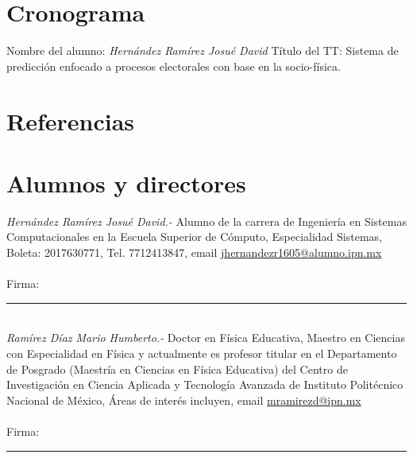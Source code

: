 \documentclass[letterpaper, 10pt]{article}
\begin{document}
\newpage
\section{Cronograma}
\newline
Nombre del alumno: \textit{Hernández Ramírez Josué David}
Título del TT: Sistema de predicción enfocado a procesos electorales con base en la socio-física.
\newpage
\section{Referencias}
\printbibliography[heading=none] %
\section{Alumnos y directores}

\begin{multicols*}{2}
    \textit{Hernández Ramírez Josué David.- }Alumno de la carrera de Ingeniería en Sistemas Computacionales en la Escuela Superior de Cómputo, Especialidad Sistemas, Boleta: 2017630771, Tel. 7712413847, email \url{jhernandezr1605@alumno.ipn.mx} \\ \\
    
    Firma: \rule{7cm}{1pt}
    \vspace{5mm} %
    \\
    \textit{Ramírez Díaz Mario Humberto.- }Doctor en Física Educativa, Maestro en Ciencias con Especialidad en Física y actualmente es profesor titular en el Departamento de Posgrado (Maestría en Ciencias en Física Educativa) del Centro de Investigación en Ciencia Aplicada y Tecnología Avanzada de Instituto Politécnico Nacional de México, Áreas de interés incluyen, email \url{mramirezd@ipn.mx} \\ \\
    
    Firma: \rule{7cm}{1pt}
\end{multicols*}
\end{document}
